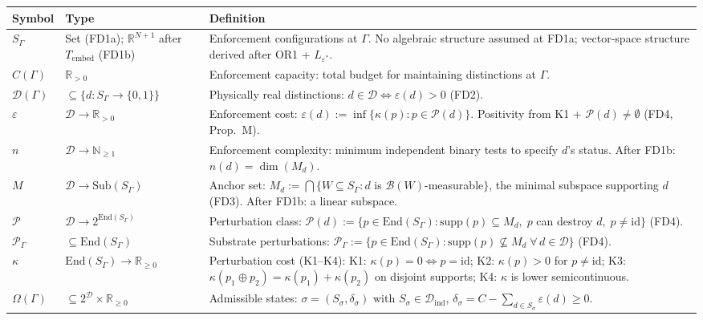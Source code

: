 \documentclass[11pt]{article}
\theoremstyle{remark}
\begin{document}
\begin{tcolorbox}[defbox, title={Formal Specification I: Enforcement Primitives at Interface $\Gamma$}]
\medskip
\begin{tabular}{@{}p{1.5cm}p{3.6cm}p{7.3cm}@{}}
\textbf{Symbol} & \textbf{Type} & \textbf{Definition} \\[2pt]
\hline\noalign{\smallskip}
$S_\Gamma$ & Set (FD1a); $\mathbb{R}^{N+1}$ after $T_{\mathrm{embed}}$ (FD1b) & Enforcement configurations at $\Gamma$.  No algebraic structure assumed at FD1a; vector-space structure derived after OR1 + $L_{\varepsilon^*}$. \\[4pt]
$C(\Gamma)$ & $\mathbb{R}_{>0}$ & Enforcement capacity: total budget for maintaining distinctions at $\Gamma$. \\[4pt]
$\mathcal{D}(\Gamma)$ & $\subseteq \{d: S_\Gamma \to \{0,1\}\}$ & Physically real distinctions: $d \in \mathcal{D} \Leftrightarrow \varepsilon(d) > 0$ (FD2). \\[4pt]
$\varepsilon$ & $\mathcal{D} \to \mathbb{R}_{>0}$ & Enforcement cost: $\varepsilon(d) := \inf\{\kappa(p) : p \in \mathcal{P}(d)\}$.  Positivity from K1 + $\mathcal{P}(d) \ne \emptyset$ (FD4, Prop.~M). \\[4pt]
$n$ & $\mathcal{D} \to \mathbb{N}_{\ge 1}$ & Enforcement complexity: minimum independent binary tests to specify $d$'s status.  After FD1b: $n(d) = \dim(M_d)$. \\[4pt]
$M$ & $\mathcal{D} \to \mathrm{Sub}(S_\Gamma)$ & Anchor set: $M_d := \bigcap\{W \subseteq S_\Gamma : d$ is $\mathcal{B}(W)$-measurable$\}$, the minimal subspace supporting $d$ (FD3).  After FD1b: a linear subspace. \\[4pt]
$\mathcal{P}$ & $\mathcal{D} \to 2^{\mathrm{End}(S_\Gamma)}$ & Perturbation class: $\mathcal{P}(d) := \{p \in \mathrm{End}(S_\Gamma) : \mathrm{supp}(p) \subseteq M_d,\; p$ can destroy $d,\; p \ne \mathrm{id}\}$ (FD4). \\[4pt]
$\mathcal{P}_\Gamma$ & $\subseteq \mathrm{End}(S_\Gamma)$ & Substrate perturbations: $\mathcal{P}_\Gamma := \{p \in \mathrm{End}(S_\Gamma) : \mathrm{supp}(p) \not\subseteq M_d\;\forall\, d \in \mathcal{D}\}$ (FD4). \\[4pt]
$\kappa$ & $\mathrm{End}(S_\Gamma) \to \mathbb{R}_{\ge 0}$ & Perturbation cost (K1--K4): K1: $\kappa(p) = 0 \Leftrightarrow p = \mathrm{id}$; K2: $\kappa(p) > 0$ for $p \ne \mathrm{id}$; K3: $\kappa(p_1 \oplus p_2) = \kappa(p_1) + \kappa(p_2)$ on disjoint supports; K4: $\kappa$ is lower semicontinuous. \\[4pt]
$\Omega(\Gamma)$ & $\subseteq 2^{\mathcal{D}} \times \mathbb{R}_{\ge 0}$ & Admissible states: $\sigma = (S_\sigma, \delta_\sigma)$ with $S_\sigma \in \mathcal{D}_{\mathrm{ind}}$, $\delta_\sigma = C - \sum_{d \in S_\sigma} \varepsilon(d) \ge 0$. \\[4pt]

\end{tabular}
\end{tcolorbox}
\end{document}
